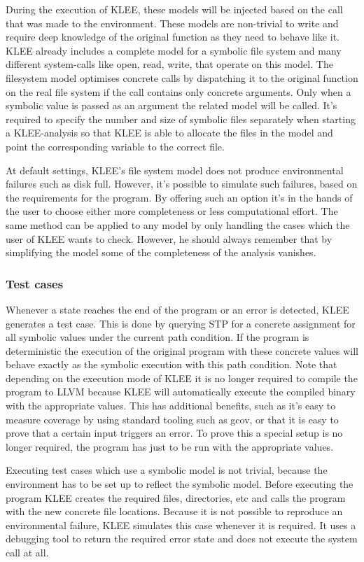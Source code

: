During the execution of KLEE, these models will be injected based on the call that was made to the environment. These models are non-trivial to write and require deep knowledge of the original function as they need to behave like it. KLEE already includes a complete model for a symbolic file system and many different system-calls like open, read, write, that operate on this model.
The filesystem model optimises concrete calls by dispatching it to the original function on the real file system if the call contains only concrete arguments. Only when a symbolic value is passed as an argument the related model will be called. It's required to specify the number and size of symbolic files separately when starting a KLEE-analysis so that KLEE is able to allocate the files in the model and point the corresponding variable to the correct file.

At default settings, KLEE's file system model does not produce environmental failures such as disk full. However, it's possible to simulate such failures, based on the requirements for the program. By offering such an option it's in the hands of the user to choose either more completeness or less computational effort. The same method can be applied to any model by only handling the cases which the user of KLEE wants to check. However, he should always remember that by simplifying the model some of the completeness of the analysis vanishes.
\subsubsection{Test cases}
Whenever a state reaches the end of the program or an error is detected, KLEE generates a test case. This is done by querying STP for a concrete assignment for all symbolic values under the current path condition. If the program is deterministic the execution of the original program with these concrete values will behave exactly as the symbolic execution with this path condition.
Note that depending on the execution mode of KLEE it is no longer required to compile the program to LLVM because KLEE will automatically execute the compiled binary with the appropriate values. This has additional benefits, such as it's easy to measure coverage by using standard tooling such as gcov, or that it is easy to prove that a certain input triggers an error. To prove this a special setup is no longer required, the program has just to be run with the appropriate values.

Executing test cases which use a symbolic model is not trivial, because the environment has to be set up to reflect the symbolic model. Before executing the program KLEE creates the required files, directories, etc and calls the program with the new concrete file locations. Because it is not possible to reproduce an environmental failure, KLEE simulates this case whenever it is required. It uses a debugging tool to return the required error state and does not execute the system call at all.
